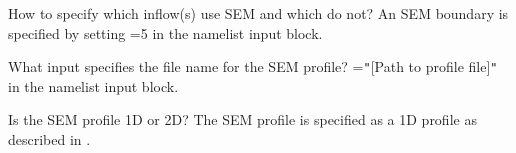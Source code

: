 \begin{QandA}
%
  \item[How to specify which inflow(s) use SEM and which do not?]
    An SEM boundary is specified by setting
    =5
    in the  namelist input block.
%
  \item[What input specifies the file name for the SEM profile?]
    =\texttt{"}[Path to profile file]\texttt{"}
    in the  namelist input block.
%
%
%
%
  \item[Is the SEM profile 1D or 2D?]
    The SEM profile is specified as a 1D profile as described in
    .
%
%
\end{QandA}


